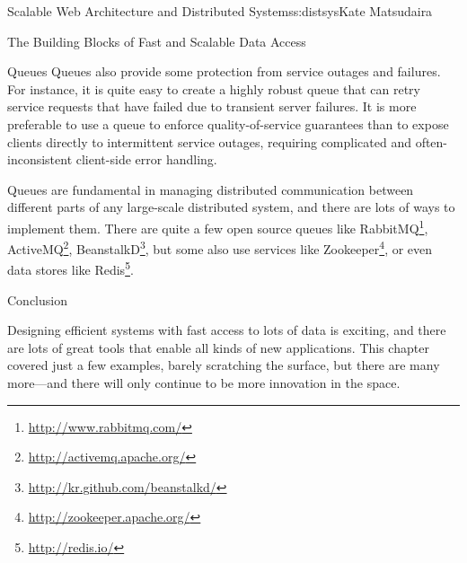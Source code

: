 \begin{aosachapter}{Scalable Web Architecture and Distributed Systems}{s:distsys}{Kate Matsudaira}
\begin{aosasect1}{The Building Blocks of Fast and Scalable Data Access}
\begin{aosasect2}{Queues}
Queues also provide some protection from service outages and
failures. For instance, it is quite easy to create a highly robust
queue that can retry service requests that have failed due to transient
server failures. It is more preferable to use a queue to enforce
quality-of-service guarantees than to expose clients directly to
intermittent service outages, requiring complicated and
often-inconsistent client-side error handling.

Queues are fundamental in managing distributed communication between
different parts of any large-scale distributed system, and there are
lots of ways to implement them. There are quite a few open source
queues like RabbitMQ\footnote{\url{http://www.rabbitmq.com/}},
ActiveMQ\footnote{\url{http://activemq.apache.org/}},
BeanstalkD\footnote{\url{http://kr.github.com/beanstalkd/}}, but some
also use services like
Zookeeper\footnote{\url{http://zookeeper.apache.org/}}, or even data
stores like Redis\footnote{\url{http://redis.io/}}.

\end{aosasect2}

\end{aosasect1}

\begin{aosasect1}{Conclusion}

Designing efficient systems with fast access to lots of data is
exciting, and there are lots of great tools that enable all kinds of
new applications. This chapter covered just a few examples, barely
scratching the surface, but there are many more---and there will only
continue to be more innovation in the space.

\end{aosasect1}

\end{aosachapter}
